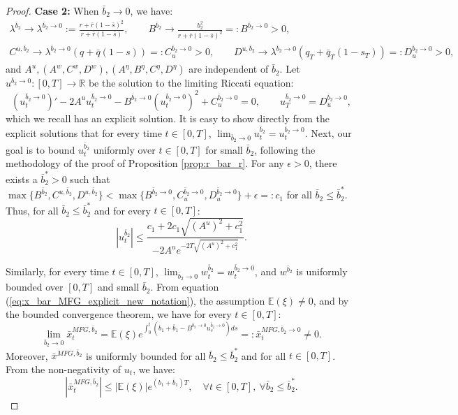 \documentclass[11pt]{article}
\begin{document}
\begin{proof}
	\textbf{Case 2: } When $\bar{b}_2 \to 0$, we have:
	\begin{equation*}
	\begin{array}{l}
		 \lambda^{\bar{b}_2} \to \lambda^{\bar{b}_2 \to 0} := \frac{r + \bar{r}(1- \bar{s})^2}{r + \bar{r}(1-\bar{s})}, \qquad 
		 B^{\bar{b}_2} \to \frac{b_2^2}{r + \bar{r}(1-\bar{s})^2}=:B^{\bar{b}_2 \to 0} > 0,\\
		 C^{u,\bar{b}_2} \to \lambda^{\bar{b}_2 \to 0}(q+\bar{q}(1-s))=:C^{\bar{b}_2 \to 0}_u >0,\qquad 
		 D^{u,\bar{b}_2} \to \lambda^{\bar{b}_2 \to 0}(q_T+\bar{q}_T(1-s_T))=:D^{\bar{b}_2 \to 0}_u > 0,
	\end{array}
	\end{equation*}
	and $A^u, (A^w, C^w, D^w), (A^\eta, B^\eta, C^\eta, D^\eta)$ are independent of $\bar{b}_2$.	
	Let $u^{\bar{b}_2 \to 0}:[0,T]\to \mathbb{R}$ be the solution to the limiting Riccati equation:
	\begin{equation}
	\left({u}^{{\bar{b}_2 \to 0}}_t\right)' - 2A^u u_t^{\bar{b}_2 \to 0} -B^{\bar{b}_2 \to 0} (u_t^{\bar{b}_2 \to 0})^2+ C^{\bar{b}_2 \to 0}_u = 0, \qquad u_T^{\bar{b}_2 \to 0} = D^{\bar{b}_2 \to 0}_u,
	\label{eq:riccati_limiting_u}
	\end{equation}
	which we recall has an explicit solution. It is easy to show directly from the explicit solutions that for every time $t\in [0,T]$, $\lim_{\bar{b}_2 \to 0}u^{\bar{b}_2}_t=u^{\bar{b}_2 \to 0}_t$. Next, our goal is to bound $u^{\bar{b}_2}_t$ uniformly over $t \in [0,T]$ for small $\bar{b}_2$, following the methodology of the proof of Proposition \ref{prop:r_bar_r}. For any $\epsilon>0$, there exists a $\bar{b}^*_2>0$ such that $\max\{ B^{\bar{b}_2},C^{u,\bar{b}_2},D^{u,\bar{b}_2} \}<\max \{B^{\bar{b}_2 \to 0},C^{\bar{b}_2 \to 0}_u,D^{\bar{b}_2 \to 0}_u \}+\epsilon=:c_1$ for all $\bar{b}_2 \leq \bar{b}^*_2$. Thus, for all $\bar{b}_2\leq \bar{b}^*_2$ and for every $t \in [0,T]$:
	\begin{equation*}
		\left \vert u_t^{\bar{b}_2} \right\vert \leq \frac{c_1 + 2 c_1 \sqrt{(A^u)^2 + c_1^2}}{-2A^u e^{-2T \sqrt{(A^u)^2 + c_1^2}}}.
	\end{equation*}
	
	Similarly, for every time $t\in [0,T]$, $\lim_{\bar{b}_2 \to 0}w^{\bar{b}_2}_t=w^{\bar{b}_2 \to 0}_t$, and  $w^{\bar{b}_2}$ is uniformly bounded over $[0,T]$ and small $\bar{b}_2$. From equation (\ref{eq:x_bar_MFG_explicit_new_notation}), the assumption $\mathbb{E}(\xi)\neq 0$, and by the bounded convergence theorem, we have for every $t \in [0,T]$:
   	\begin{equation}
   	\lim_{\bar{b}_2 \to 0} \bar{x}_t^{MFG,\bar{b}_2} = \mathbb{E}(\xi) e^{\int_0^t (b_1 + \bar{b}_1 - B^{\bar{b}_2 \to 0}u^{\bar{b}_2 \to 0}_s) ds} =: \bar{x}^{MFG,\bar{b}_2 \to 0}_t\neq 0.
   	\label{eq:x_bar_neq_0}
   	\end{equation}
	Moreover, $\bar{x}^{MFG,\bar{b}_2}$ is uniformly bounded for all $\bar{b}_2 \leq \bar{b}^*_2$ and for all $t \in [0,T]$. From the non-negativity of $u_t$, we have:
	$$ \left\vert \bar{x}^{MFG,\bar{b}_2}_t \right\vert \leq \left\vert \mathbb{E}(\xi) \right\vert e^{ (b_1 + \bar{b}_1 ) T }, \quad \forall t \in [0,T], \ \forall \bar{b}_2 \leq \bar{b}^*_2. $$ 
   	

\end{proof}
\end{document}

